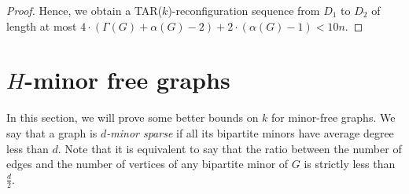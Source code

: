 \documentclass[10pt]{article}
\begin{document}
\begin{proof}
Hence, we obtain a {\sf TAR}($k$)-reconfiguration sequence from $D_1$ to $D_2$ of length at most $4 \cdot (\Gamma(G) + \alpha(G)-2) + 2 \cdot (\alpha(G)-1) < 10n$. 
\end{proof}


\section{\texorpdfstring{$H$}{H}-minor free graphs}\label{sec:minorUB}

In this section, we will prove some better bounds on $k$ for minor-free graphs.
We say that a graph is \emph{$d$-minor sparse} if all its bipartite minors have average degree less than $d$. Note that it is equivalent to say that the ratio between the number of edges and the number of vertices of any bipartite minor of $G$ is strictly less than $\frac{d}{2}$.
\end{document}
